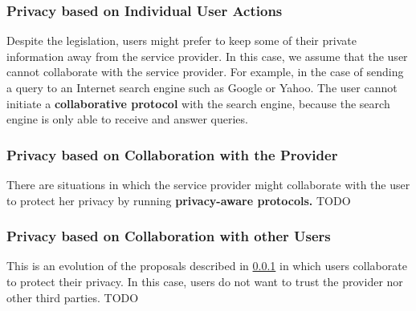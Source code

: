 \subsubsection{Privacy based on Individual User Actions}\label{sssec:num2}
Despite the legislation,
	users might prefer to keep some of their private information away from the service provider.
In this case,
	we assume that the user cannot collaborate with the service provider.
For example,
	in the case of sending a query to an Internet search engine such as Google or Yahoo.
The user cannot initiate a \textbf{collaborative protocol} with the search engine,
	because the search engine is only able to receive and answer queries.

\subsubsection{Privacy based on Collaboration with the Provider}
There are situations in which the service provider might collaborate with the user to protect her privacy by running \textbf{privacy-aware protocols.}
TODO

\subsubsection{Privacy based on Collaboration with other Users}
This is an evolution of the proposals described in \ref{sssec:num2} in which users collaborate to protect their privacy.
In this case,
	users do not want to trust the provider nor other third parties.
TODO





